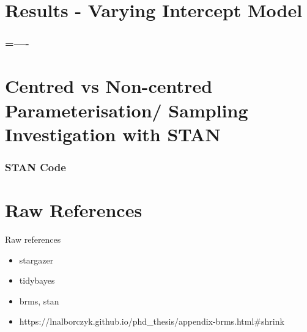 \documentclass{beamer}
\begin{document}
\section{Results - Varying Intercept Model}

\begin{frame}
\frametitle{=----}

\end{frame}

\section{Centred vs Non-centred Parameterisation/ Sampling Investigation with STAN}

\begin{frame}
\frametitle{STAN Code}

\end{frame}

\section{Raw References}

\begin{frame}{Raw references}
    \begin{itemize}
        \item stargazer
        \item tidybayes
        \item brms, stan
        \item https://lnalborczyk.github.io/phd_thesis/appendix-brms.html#shrink
    \end{itemize}
\end{frame}
\end{document}
